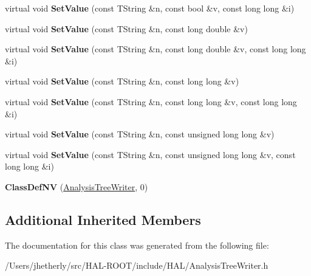 \begin{DoxyCompactItemize}
\item 
\hypertarget{class_h_a_l_1_1_analysis_tree_writer_a85b8b7790bb9392ed1d865daab3248d7}{virtual void {\bfseries Set\+Value} (const T\+String \&n, const bool \&v, const long long \&i)}\label{class_h_a_l_1_1_analysis_tree_writer_a85b8b7790bb9392ed1d865daab3248d7}

\item 
\hypertarget{class_h_a_l_1_1_analysis_tree_writer_a2e68fdea10ca87aebab5332c2b680286}{virtual void {\bfseries Set\+Value} (const T\+String \&n, const long double \&v)}\label{class_h_a_l_1_1_analysis_tree_writer_a2e68fdea10ca87aebab5332c2b680286}

\item 
\hypertarget{class_h_a_l_1_1_analysis_tree_writer_ae4fbd939b2edfc2c3859ca24f635a475}{virtual void {\bfseries Set\+Value} (const T\+String \&n, const long double \&v, const long long \&i)}\label{class_h_a_l_1_1_analysis_tree_writer_ae4fbd939b2edfc2c3859ca24f635a475}

\item 
\hypertarget{class_h_a_l_1_1_analysis_tree_writer_a73bed978557c7222f4c88b71c1b74424}{virtual void {\bfseries Set\+Value} (const T\+String \&n, const long long \&v)}\label{class_h_a_l_1_1_analysis_tree_writer_a73bed978557c7222f4c88b71c1b74424}

\item 
\hypertarget{class_h_a_l_1_1_analysis_tree_writer_abc1b0d49980dfe48e99cf3c03f271bb3}{virtual void {\bfseries Set\+Value} (const T\+String \&n, const long long \&v, const long long \&i)}\label{class_h_a_l_1_1_analysis_tree_writer_abc1b0d49980dfe48e99cf3c03f271bb3}

\item 
\hypertarget{class_h_a_l_1_1_analysis_tree_writer_ad7fc39378d544f275cbb19145def8fbf}{virtual void {\bfseries Set\+Value} (const T\+String \&n, const unsigned long long \&v)}\label{class_h_a_l_1_1_analysis_tree_writer_ad7fc39378d544f275cbb19145def8fbf}

\item 
\hypertarget{class_h_a_l_1_1_analysis_tree_writer_ae71437812731ea60b3375c771ff912e1}{virtual void {\bfseries Set\+Value} (const T\+String \&n, const unsigned long long \&v, const long long \&i)}\label{class_h_a_l_1_1_analysis_tree_writer_ae71437812731ea60b3375c771ff912e1}

\item 
\hypertarget{class_h_a_l_1_1_analysis_tree_writer_a77da0342b01b89846c418b825d3a9d99}{{\bfseries Class\+Def\+N\+V} (\hyperlink{class_h_a_l_1_1_analysis_tree_writer}{Analysis\+Tree\+Writer}, 0)}\label{class_h_a_l_1_1_analysis_tree_writer_a77da0342b01b89846c418b825d3a9d99}

\end{DoxyCompactItemize}
\subsection*{Additional Inherited Members}


The documentation for this class was generated from the following file\+:\begin{DoxyCompactItemize}
\item 
/\+Users/jhetherly/src/\+H\+A\+L-\/\+R\+O\+O\+T/include/\+H\+A\+L/Analysis\+Tree\+Writer.\+h\end{DoxyCompactItemize}

